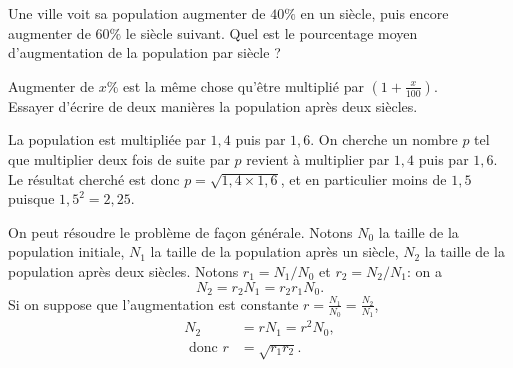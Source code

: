 \begin{exo}
Une ville voit sa population augmenter de $40\%$ en un siècle, puis encore augmenter de $60\%$ le siècle suivant. Quel est le pourcentage moyen d'augmentation de la population par siècle ?

\begin{hint} %
Augmenter de $x\%$ est la même chose qu'être multiplié par $\displaystyle \left( 1+\frac{x}{100} \right)$. \\
Essayer d'écrire de deux manières la population après deux siècles.
\end{hint}

\begin{sol} %
La population est multipliée par $1,4$ puis par $1,6$. On cherche un nombre $p$ tel que multiplier deux fois de suite par $p$ revient à multiplier par $1,4$ puis par $1,6$. Le résultat cherché est donc $p=\sqrt{1,4\times 1,6}$, et en particulier moins de $1,5$ puisque $1,5^2=2,25$.

On peut résoudre le problème de façon générale. 
Notons $N_0$ la taille de la population initiale, $N_1$ la taille de la population après un siècle, $N_2$ la taille de la population après deux siècles. Notons $r_1=N_1/N_0$ et $r_2=N_2/N_1$: on a
$$N_2=r_2N_1=r_2r_1N_0.$$
Si on suppose que l'augmentation est constante $\displaystyle r=\frac{N_1}{N_0}=\frac{N_2}{N_1}$, 
\begin{align*}
N_2 &= rN_1=r^2N_0, \\
\text{ donc } r & =\sqrt{r_1r_2}.
\end{align*}

\end{sol}
\end{exo}

